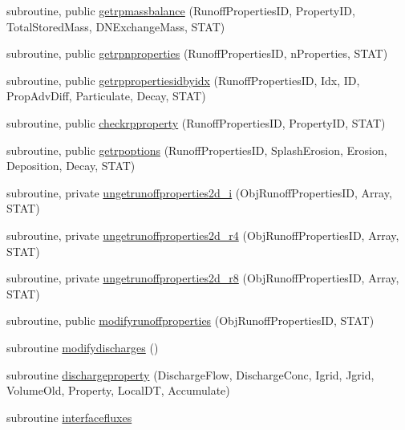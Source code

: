 \begin{DoxyCompactItemize}
\item 
subroutine, public \mbox{\hyperlink{namespacemodulerunoffproperties_a9588522d88fead0d0a355bc1c32062b9}{getrpmassbalance}} (Runoff\+Properties\+ID, Property\+ID, Total\+Stored\+Mass, D\+N\+Exchange\+Mass, S\+T\+AT)
\item 
subroutine, public \mbox{\hyperlink{namespacemodulerunoffproperties_a4e8dd453019d74193b19d83465d41e85}{getrpnproperties}} (Runoff\+Properties\+ID, n\+Properties, S\+T\+AT)
\item 
subroutine, public \mbox{\hyperlink{namespacemodulerunoffproperties_a99e35b0a7f1f65083cde0db46427a9df}{getrppropertiesidbyidx}} (Runoff\+Properties\+ID, Idx, ID, Prop\+Adv\+Diff, Particulate, Decay, S\+T\+AT)
\item 
subroutine, public \mbox{\hyperlink{namespacemodulerunoffproperties_a2c0e22dfe3b09a4715eaf763f273241b}{checkrpproperty}} (Runoff\+Properties\+ID, Property\+ID, S\+T\+AT)
\item 
subroutine, public \mbox{\hyperlink{namespacemodulerunoffproperties_ad5669badf377e3cc3ab36dd0f775f5fa}{getrpoptions}} (Runoff\+Properties\+ID, Splash\+Erosion, Erosion, Deposition, Decay, S\+T\+AT)
\item 
subroutine, private \mbox{\hyperlink{namespacemodulerunoffproperties_af2f8fff6028d006b30f2d2c823a5e384}{ungetrunoffproperties2d\+\_\+i}} (Obj\+Runoff\+Properties\+ID, Array, S\+T\+AT)
\item 
subroutine, private \mbox{\hyperlink{namespacemodulerunoffproperties_a85270cee7ca1e6d07d2853a9380f1987}{ungetrunoffproperties2d\+\_\+r4}} (Obj\+Runoff\+Properties\+ID, Array, S\+T\+AT)
\item 
subroutine, private \mbox{\hyperlink{namespacemodulerunoffproperties_abb57930bec871aba1885b2ccb5a1eaee}{ungetrunoffproperties2d\+\_\+r8}} (Obj\+Runoff\+Properties\+ID, Array, S\+T\+AT)
\item 
subroutine, public \mbox{\hyperlink{namespacemodulerunoffproperties_a3d6f36b2dc50b19f17e60e0778172343}{modifyrunoffproperties}} (Obj\+Runoff\+Properties\+ID, S\+T\+AT)
\item 
subroutine \mbox{\hyperlink{namespacemodulerunoffproperties_a2c08e63707bcb52fb1de5d2a76a15433}{modifydischarges}} ()
\item 
subroutine \mbox{\hyperlink{namespacemodulerunoffproperties_a0c6359324c15a7b6b781861fed41ffb8}{dischargeproperty}} (Discharge\+Flow, Discharge\+Conc, Igrid, Jgrid, Volume\+Old, Property, Local\+DT, Accumulate)
\item 
subroutine \mbox{\hyperlink{namespacemodulerunoffproperties_a076e539417a822f7177b60e8449345e3}{interfacefluxes}}

\end{DoxyCompactItemize}
